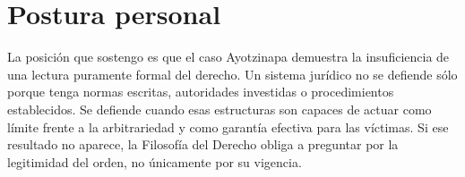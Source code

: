 \documentclass[
	spanish,
	letterpaper, oneside
]{article}
\begin{document}
%
%

\section{Postura personal}

La posición que sostengo es que el caso Ayotzinapa demuestra la insuficiencia de una lectura puramente formal del derecho. Un sistema jurídico no se defiende sólo porque tenga normas escritas, autoridades investidas o procedimientos establecidos. Se defiende cuando esas estructuras son capaces de actuar como límite frente a la arbitrariedad y como garantía efectiva para las víctimas. Si ese resultado no aparece, la Filosofía del Derecho obliga a preguntar por la legitimidad del orden, no únicamente por su vigencia.
\end{document}
